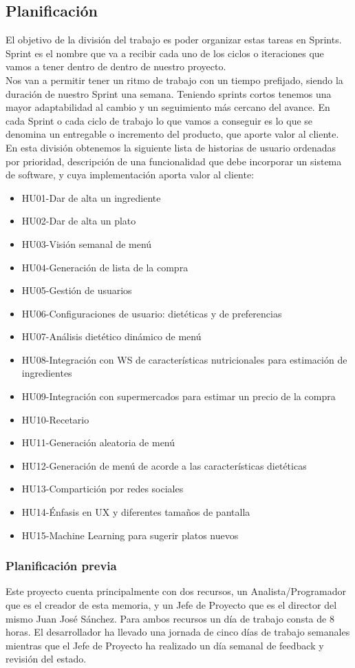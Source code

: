 \documentclass[12pt, a4paper, twoside]{book}
\begin{document}
	\subsection{Planificación}
	El objetivo de la división del trabajo es poder organizar estas tareas en Sprints.\\
	Sprint es el nombre que va a recibir cada uno de los ciclos o iteraciones que vamos a tener dentro de dentro de nuestro proyecto.\\	
	Nos van a permitir tener un ritmo de trabajo con un tiempo prefijado, siendo la duración de nuestro Sprint una semana. Teniendo sprints cortos tenemos una mayor adaptabilidad al cambio y un seguimiento más cercano del avance.	En cada Sprint o cada ciclo de trabajo lo que vamos a conseguir es lo que se denomina un entregable o incremento del producto, que aporte valor al cliente.
	En esta división obtenemos la siguiente lista de historias de usuario ordenadas por prioridad, descripción de una funcionalidad que debe incorporar un sistema de software, y cuya implementación aporta valor al cliente:
	\begin{itemize}
		\item HU01-Dar de alta un ingrediente
		\item HU02-Dar de alta un plato
		\item HU03-Visión semanal de menú
		\item HU04-Generación de lista de la compra
		\item HU05-Gestión de usuarios
		\item HU06-Configuraciones de usuario: dietéticas y de preferencias
		\item HU07-Análisis dietético dinámico de menú
		\item HU08-Integración con WS de características nutricionales para estimación de ingredientes
		\item HU09-Integración con supermercados para estimar un precio de la compra
		\item HU10-Recetario
		\item HU11-Generación aleatoria de menú
		\item HU12-Generación de menú de acorde a las características dietéticas
		\item HU13-Compartición por redes sociales
		\item HU14-Énfasis en UX y diferentes tamaños de pantalla
		\item HU15-Machine Learning para sugerir platos nuevos
	\end{itemize}
	\subsubsection{Planificación previa}
	Este proyecto cuenta principalmente con dos recursos, un Analista/Programador que es el creador de esta memoria, y un Jefe de Proyecto que es el director del mismo Juan José Sánchez. Para ambos recursos un día de trabajo consta de 8 horas. El desarrollador ha llevado una jornada de cinco días de trabajo semanales mientras que el Jefe de Proyecto ha realizado un día semanal de feedback y revisión del estado.
\end{document}
